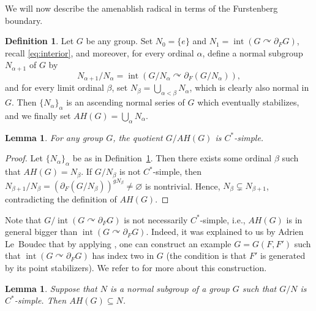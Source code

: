 \documentclass[a4paper]{amsart}
\theoremstyle{plain}
\newtheorem{lemma}[theorem]{Lemma}
\theoremstyle{definition}
\newtheorem{definition}[theorem]{Definition}
\theoremstyle{remark}
\numberwithin{theorem}{section}
\begin{document}
We will now describe the amenablish radical in terms of the Furstenberg boundary.

\begin{definition}\label{def:AH-radical}
Let $G$ be any group.
Set $N_0=\{e\}$ and $N_1=\operatorname{int}(G\curvearrowright\partial_F G)$, recall \eqref{eq:interior},
and moreover, for every ordinal $\alpha$, define a normal subgroup $N_{\alpha+1}$ of $G$ by
\[
N_{\alpha+1}/N_\alpha=\operatorname{int}(G/N_\alpha\curvearrowright\partial_F(G/N_\alpha)),
\]
and for every limit ordinal $\beta$, set $N_\beta=\bigcup_{\alpha<\beta}N_\alpha$, which is clearly also normal in $G$.
Then $\{N_\alpha\}_\alpha$ is an ascending normal series of $G$ which eventually stabilizes,
and we finally set $AH(G)=\bigcup_\alpha N_\alpha$.
\end{definition}

\begin{lemma}\label{lem:AH-quotient}
For any group $G$, the quotient $G/AH(G)$ is $C^*$-simple.
\end{lemma}

\begin{proof}
Let $\{N_\alpha\}_\alpha$ be as in Definition~\ref{def:AH-radical}.
Then there exists some ordinal $\beta$ such that $AH(G)=N_\beta$.
If $G/N_\beta$ is not $C^*$-simple,
then $N_{\beta+1}/N_\beta=(\partial_F(G/N_\beta))^{gN_\beta}\neq\varnothing$ is nontrivial.
Hence, $N_\beta\subsetneq N_{\beta+1}$, contradicting the definition of $AH(G)$.
\end{proof}

Note that $G/\operatorname{int}(G\curvearrowright\partial_F G)$ is not necessarily $C^*$-simple, i.e.,
$AH(G)$ is in general bigger than $\operatorname{int}(G\curvearrowright\partial_F G)$.
Indeed, it was explained to us by Adrien Le~Boudec that by applying \cite[Theorem~1.11]{Boudec-Bon},
one can construct an example $G=G(F,F')$ such that $\operatorname{int}(G\curvearrowright\partial_F G)$ has index two in $G$
(the condition is that $F'$ is generated by its point stabilizers).
We refer to \cite{Boudec2,Boudec,Boudec-Bon} for more about this construction.

\begin{lemma}\label{lem:simple-quotient}
Suppose that $N$ is a normal subgroup of a group $G$ such that $G/N$ is $C^*$-simple.
Then $AH(G)\subseteq N$.
\end{lemma}
\end{document}
